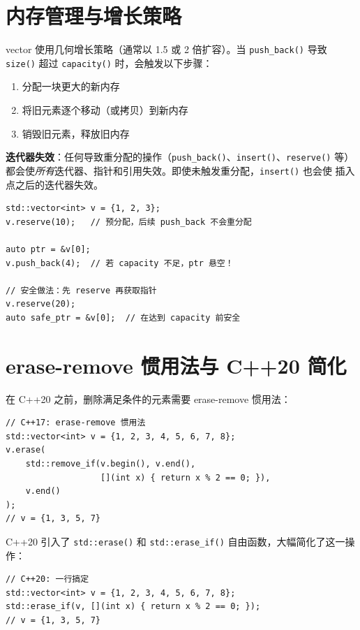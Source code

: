 \documentclass[12pt,a4paper,fontset=fandol]{ctexbook}
\newcommand{\cpp}[1]{C++#1}
\newcommand{\Fn}[1]{\texttt{#1()}}
\begin{document}
\section{内存管理与增长策略}

vector 使用几何增长策略（通常以 1.5 或 2 倍扩容）。当 \Fn{push\_back} 导致
\Fn{size} 超过 \Fn{capacity} 时，会触发以下步骤：

\begin{enumerate}
\item 分配一块更大的新内存
\item 将旧元素逐个移动（或拷贝）到新内存
\item 销毁旧元素，释放旧内存
\end{enumerate}

\begin{warning}
\textbf{迭代器失效}：任何导致重分配的操作（\Fn{push\_back}、\Fn{insert}、\Fn{reserve}
等）都会使\emph{所有}迭代器、指针和引用失效。即使未触发重分配，\Fn{insert} 也会使
插入点之后的迭代器失效。
\end{warning}

\begin{lstlisting}
std::vector<int> v = {1, 2, 3};
v.reserve(10);   // 预分配，后续 push_back 不会重分配

auto ptr = &v[0];
v.push_back(4);  // 若 capacity 不足，ptr 悬空！

// 安全做法：先 reserve 再获取指针
v.reserve(20);
auto safe_ptr = &v[0];  // 在达到 capacity 前安全
\end{lstlisting}

\section{erase-remove 惯用法与 C++20 简化}

在 C++20 之前，删除满足条件的元素需要 erase-remove 惯用法：

\begin{lstlisting}
// C++17: erase-remove 惯用法
std::vector<int> v = {1, 2, 3, 4, 5, 6, 7, 8};
v.erase(
    std::remove_if(v.begin(), v.end(),
                   [](int x) { return x % 2 == 0; }),
    v.end()
);
// v = {1, 3, 5, 7}
\end{lstlisting}

\cpp{20} 引入了 \Fn{std::erase} 和 \Fn{std::erase\_if} 自由函数，大幅简化了这一操作：

\begin{lstlisting}
// C++20: 一行搞定
std::vector<int> v = {1, 2, 3, 4, 5, 6, 7, 8};
std::erase_if(v, [](int x) { return x % 2 == 0; });
// v = {1, 3, 5, 7}
\end{lstlisting}
\end{document}
